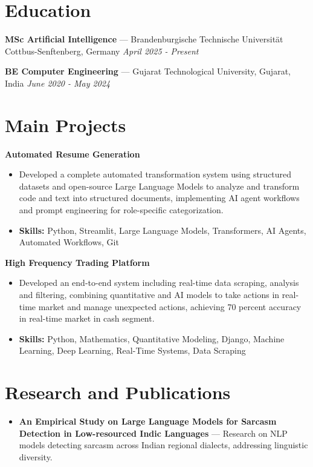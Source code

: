 \documentclass[a4paper,10pt]{article}
\begin{document}
\section*{Education}
\textbf{MSc Artificial Intelligence} — Brandenburgische Technische Universität Cottbus-Senftenberg, Germany \hfill \textit{April 2025 - Present}\par
\vspace{1.5pt}
\textbf{BE Computer Engineering} — Gujarat Technological University, Gujarat, India \hfill \textit{June 2020 - May 2024}\par

\section*{Main Projects}
\textbf{Automated Resume Generation}\par
\vspace{1pt}
\begin{itemize}
  \item Developed a complete automated transformation system using structured datasets and open-source Large Language Models to analyze and transform code and text into structured documents, implementing AI agent workflows and prompt engineering for role-specific categorization.
  \item \textbf{Skills:} Python, Streamlit, Large Language Models, Transformers, AI Agents, Automated Workflows, Git
\end{itemize}
\vspace{3pt}
\textbf{High Frequency Trading Platform}\par
\vspace{1pt}
\begin{itemize}
  \item Developed an end-to-end system including real-time data scraping, analysis and filtering, combining quantitative and AI models to take actions in real-time market and manage unexpected actions, achieving 70 percent accuracy in real-time market in cash segment.
  \item \textbf{Skills:} Python, Mathematics, Quantitative Modeling, Django, Machine Learning, Deep Learning, Real-Time Systems, Data Scraping
\end{itemize}

\section*{Research and Publications}
\begin{itemize}
\item \textbf{An Empirical Study on Large Language Models for Sarcasm Detection in Low-resourced Indic Languages} — Research on NLP models detecting sarcasm across Indian regional dialects, addressing linguistic diversity.
\end{itemize}
\end{document}
